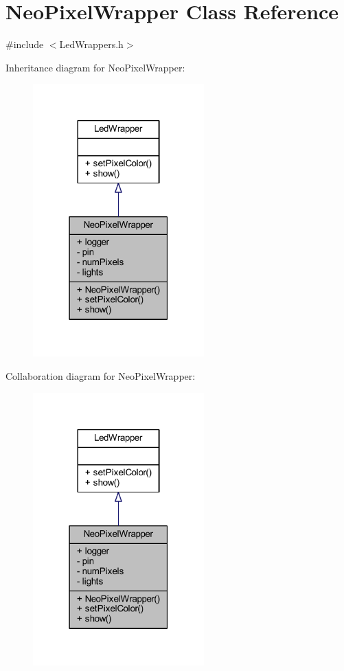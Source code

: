 \hypertarget{class_neo_pixel_wrapper}{}\section{Neo\+Pixel\+Wrapper Class Reference}
\label{class_neo_pixel_wrapper}


{\ttfamily \#include $<$Led\+Wrappers.\+h$>$}



Inheritance diagram for Neo\+Pixel\+Wrapper\+:
\nopagebreak
\begin{figure}[H]
\begin{center}
\leavevmode
\includegraphics[width=187pt]{class_neo_pixel_wrapper__inherit__graph}
\end{center}
\end{figure}


Collaboration diagram for Neo\+Pixel\+Wrapper\+:
\nopagebreak
\begin{figure}[H]
\begin{center}
\leavevmode
\includegraphics[width=187pt]{class_neo_pixel_wrapper__coll__graph}
\end{center}
\end{figure}
